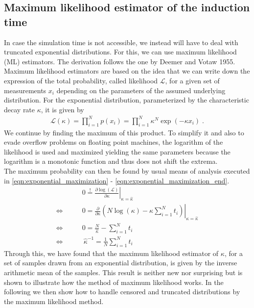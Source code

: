 \subsection{Maximum likelihood estimator of the induction time}
\label{sec:ml_estimator}
In case the simulation time is not accessible, we instead will have to deal with truncated exponential distributions. For this, we can use maximum likelihood (ML) estimators. The derivation follows the one by Deemer and Votaw 1955\cite{Deemer1955}.\\

Maximum likelihood estimators are based on the idea that we can write down the expression of the total probability, called likelihood $\mathcal{L}$, for a given set of measurements $x_i$ depending on the parameters of the assumed underlying distribution. For the exponential distribution, parameterized by the characteristic decay rate $\kappa$, it is given by
\begin{align}
\label{eqn:exponential_product}
\mathcal{L}(\kappa) = \prod_{i=1}^N p(x_i) = \prod_{i=1}^N \kappa^N \exp\left( - \kappa x_i \right ) \; \text{.}
\end{align}
We continue by finding the maximum of this product. To simplify it and also to evade overflow problems on floating point machines, the logarithm of the likelihood is used and maximized yielding the same parameters because the logarithm is a monotonic function and thus does not shift the extrema.\\
The maximum probability can then be found by usual means of analysis executed in \autoref{eqn:exponential_maximization} - \autoref{eqn:exponential_maximization_end}.
\begin{align}
\label{eqn:exponential_maximization}
& 0 \stackrel{!}{=} \left. \frac{\partial \log (\mathcal{L})}{\partial \kappa} \right|_{\kappa=\hat{\kappa}}\\
\Leftrightarrow \qquad  &0 = \left. \frac{\partial}{\partial \kappa} \left( N \log(\kappa) - \kappa \sum_{i=1}^N t_i \right)  \right|_{\kappa=\hat{\kappa}} \\
\Leftrightarrow \qquad &0 = \frac{N}{\hat{\kappa}} - \sum_{i=1}^N t_i \\
\label{eqn:exponential_maximization_end}
\Leftrightarrow  \qquad & \!\!\!\!\!\!\!\!\: \hat{\kappa}^{-1} = \frac{1}{N} \sum_{i=1}^N t_i  
\end{align}
Through this, we have found that the maximum likelihood estimator of $\kappa$, for a set of samples drawn from an exponential distribution, is given by the inverse arithmetic mean of the samples. This result is neither new nor surprising but is shown to illustrate how the method of maximum likelihood works. In the following we then show how to handle censored and truncated distributions by the maximum likelihood method.\\
